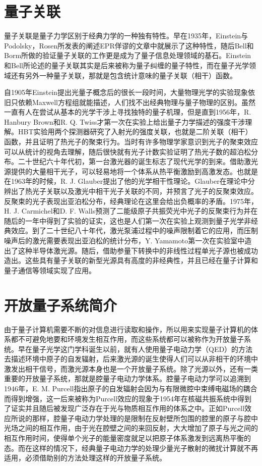 \section{量子关联}
量子关联是量子力学区别于经典力学的一种独有特性。早在1935年，Einstein与Podolsky，Rosen所发表的阐述EPR佯谬的文章中就展示了这种特性，随后Bell和Borm所做的验证量子关联的工作更是成为了量子信息处理领域的基石。Einstein和Bell所论述的量子关联其实是后来被称为量子纠缠的量子特性，而在量子光学领域还有另外一种量子关联，那就是包含统计意味的量子关联（相干）函数。

自1905年Einstein提出光量子概念后的很长一段时间，大量物理光学的实验现象依旧只依赖Maxwell方程组就能描述，人们找不出经典物理与量子物理的区别。虽然一直有人在尝试从基本的光学干涉上寻找独特的量子机理，但是直到1956年，R. Hanbury Brown和R. Q. Twiss才第一次在实验上给出量子力学描述的强度干涉理解。HBT实验用两个探测器研究了入射光的强度关联，也就是二阶关联（相干）函数，并且证明了热光子的聚束行为。当时有许多物理学家意识到光子的聚束效应可以从统计的视角去理解，随后很快就有光子计数实验证明了热光子数的超泊松分布。二十世纪六十年代初，第一台激光器的诞生标志了现代光学的到来。借助激光源提供的大量相干光子，可以轻易地将一个体系从热平衡激励到高激发态。也就是在1963年的时候，R. J. Glauber提出了他的光学相干性理论。Glauber在理论中分辨出了热光子关联以及激光中相干光子关联的不同，并预言了光子的反聚束效应。反聚束的光子表现出亚泊松分布，经典理论在这里会给出负概率的矛盾。1975年，H. J. Carmichel和D. F. Walls预测了二能级原子共振荧光中光子的反聚束行为并在随后的一年中得到了实验的证实，这也是人们第一次在实验上观测到量子光学非经典效应\cite{walls2007quantum}。到了二十世纪八十年代，激光泵浦过程中的噪声限制着它的应用，而压制噪声后的激光需要表现出亚泊松的统计分布，Y. Yamamoto第一次在实验室中造出了这种半导体激光源。随后，借助参量下转换中的非线性过程单光子源也被成功造出。这些具有量子关联的新型光源具有高度的非经典性，并且已经在量子计算和量子通信等领域实现了应用。

\section{开放量子系统简介}
由于量子计算机需要不断的对信息进行读取和操作，所以用来实现量子计算机的体系都不可避免地要和环境发生相互作用，而这些系统都可以被称作为开放量子系统。早在量子光学这门学科诞生以前，就有人使用量子电动力学（QED）的方法去描述环境中原子的自发辐射，后来激光源的诞生使得人们可以从非相干的环境中激发出相干信号，而激光源本身也是一个开放量子系统。除了光源以外，还有一类重要的开放量子系统，那就是腔量子电动力学体系。腔量子电动力学可以追溯到1946年，E. M. Purcell指出原子的自发辐射会因为与有限微腔中束缚电磁场的耦合而得到增强，这一后来被称为Purcell效应的现象于1954年在核磁共振系统中得到了证实并且随后被发现广泛存在于光与物质相互作用的体系之中。正如Purcell效应所说的那样，腔量子电动力学处理的是限制在反射壁所包围的腔里的原子与腔中光场之间的相互作用，由于光在腔壁之间的来回反射，大大增加了原子与光之间的相互作用时间，使得单个光子的能量密度就足以把原子体系激发到远离热平衡的态。而在这样的情况下，经典量子电动力学的处理少量光子散射的微扰计算就不再适用，必须借助别的方法处理这样的开放量子系统。

